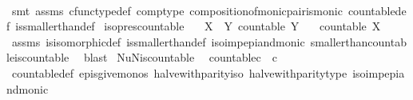 \begin{isabellebody}
\ \ %
\endisadelimproof
%
\isatagproof
{}\isamarkupfalse%
\ {\isacharparenleft}{\kern0pt}smt\ assms\ cfunc{\isacharunderscore}{\kern0pt}type{\isacharunderscore}{\kern0pt}def\ comp{\isacharunderscore}{\kern0pt}type\ composition{\isacharunderscore}{\kern0pt}of{\isacharunderscore}{\kern0pt}monic{\isacharunderscore}{\kern0pt}pair{\isacharunderscore}{\kern0pt}is{\isacharunderscore}{\kern0pt}monic\ countable{\isacharunderscore}{\kern0pt}def\ is{\isacharunderscore}{\kern0pt}smaller{\isacharunderscore}{\kern0pt}than{\isacharunderscore}{\kern0pt}def{\isacharparenright}{\kern0pt}%
\endisatagproof
{\isafoldproof}%
%
\isadelimproof
\isanewline
%
\endisadelimproof
\isanewline
{}\isamarkupfalse%
\ iso{\isacharunderscore}{\kern0pt}pres{\isacharunderscore}{\kern0pt}countable{\isacharcolon}{\kern0pt}\isanewline
\ \ \ {\isachardoublequoteopen}X\ {\isasymcong}\ Y{\isachardoublequoteclose}\ {\isachardoublequoteopen}countable\ Y{\isachardoublequoteclose}\isanewline
\ \ \ {\isachardoublequoteopen}countable\ X{\isachardoublequoteclose}\isanewline
%
\isadelimproof
\ \ %
\endisadelimproof
%
\isatagproof
{}\isamarkupfalse%
\ assms\ is{\isacharunderscore}{\kern0pt}isomorphic{\isacharunderscore}{\kern0pt}def\ is{\isacharunderscore}{\kern0pt}smaller{\isacharunderscore}{\kern0pt}than{\isacharunderscore}{\kern0pt}def\ iso{\isacharunderscore}{\kern0pt}imp{\isacharunderscore}{\kern0pt}epi{\isacharunderscore}{\kern0pt}and{\isacharunderscore}{\kern0pt}monic\ smaller{\isacharunderscore}{\kern0pt}than{\isacharunderscore}{\kern0pt}countable{\isacharunderscore}{\kern0pt}is{\isacharunderscore}{\kern0pt}countable\ \isamarkupfalse%
\ blast%
\endisatagproof
{\isafoldproof}%
%
\isadelimproof
\isanewline
%
\endisadelimproof
\isanewline
{}\isamarkupfalse%
\ NuN{\isacharunderscore}{\kern0pt}is{\isacharunderscore}{\kern0pt}countable{\isacharcolon}{\kern0pt}\isanewline
\ \ {\isachardoublequoteopen}countable{\isacharparenleft}{\kern0pt}{\isasymnat}\isactrlsub c\ {\isasymCoprod}\ {\isasymnat}\isactrlsub c{\isacharparenright}{\kern0pt}{\isachardoublequoteclose}\isanewline
%
\isadelimproof
\ \ %
\endisadelimproof
%
\isatagproof
{}\isamarkupfalse%
\ countable{\isacharunderscore}{\kern0pt}def\ epis{\isacharunderscore}{\kern0pt}give{\isacharunderscore}{\kern0pt}monos\ halve{\isacharunderscore}{\kern0pt}with{\isacharunderscore}{\kern0pt}parity{\isacharunderscore}{\kern0pt}iso\ halve{\isacharunderscore}{\kern0pt}with{\isacharunderscore}{\kern0pt}parity{\isacharunderscore}{\kern0pt}type\ iso{\isacharunderscore}{\kern0pt}imp{\isacharunderscore}{\kern0pt}epi{\isacharunderscore}{\kern0pt}and{\isacharunderscore}{\kern0pt}monic\ \isamarkupfalse%

\end{isabellebody}

